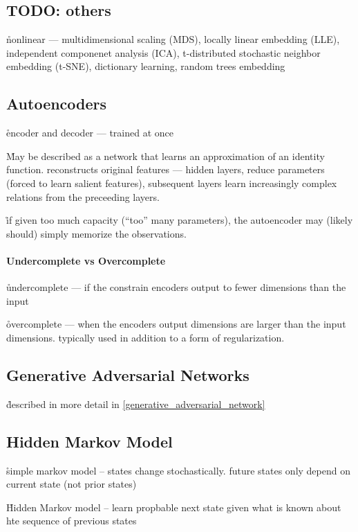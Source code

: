 \subsection{TODO: others}





\r{nonlinear --- multidimensional scaling (MDS), locally linear embedding (LLE), independent componenet analysis (ICA), t-distributed stochastic neighbor embedding (t-SNE), dictionary learning, random trees embedding}

\subsection{Autoencoders}


\r{encoder and decoder --- trained at once}

\r{May be described as a network that learns an approximation of an identity function. reconstructs original features --- hidden layers, reduce parameters (forced to learn salient features), subsequent layers learn increasingly complex relations from the preceeding layers.}

\r{if given too much capacity (``too'' many parameters), the autoencoder may (likely should) simply memorize the observations.}

\paragraph{Undercomplete vs Overcomplete}
\r{undercomplete --- if the constrain encoders output to fewer dimensions than the input}

\r{overcomplete --- when the encoders output dimensions are larger than the input dimensions. typically used in addition to a form of regularization.}




\subsection{Generative Adversarial Networks}

\r{described in more detail in \ref{generative_adversarial_network}}

\subsection{Hidden Markov Model}

\r{simple markov model -- states change stochastically. future states only depend on current state (not prior states)}

\r{Hidden Markov model -- learn propbable next state given what is known about hte sequence of previous states}